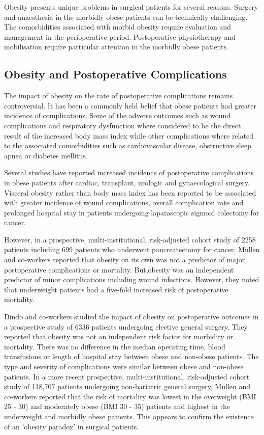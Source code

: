 Obesity presents unique problems in surgical patients for several reasons. Surgery and anaesthesia in the morbidly obese patients can be technically challenging. The comorbidities associated with morbid obesity require evaluation and management in the perioperative period. Postoperative physiotherapy and mobilisation require particular attention in the morbidly obese patients. 

\subsection{Obesity and Postoperative Complications}

The impact of obesity on the rate of postoperative complications remains controversial. It has been a commonly held belief that obese patients had greater incidence of complications. Some of the adverse outcomes such as wound complications and respiratory dysfunction where considered to be the direct result of the increased body mass index while other complications where related to the associated comorbidities such as cardiovascular disease, obstructive sleep apnea or diabetes mellitus. 

Several studies have reported increased incidence of postoperative complications in obese patients after cardiac, transplant, urologic and gynaecological surgery. \parencite{prem_operative_1965, holley_obesity_1990, fasol_influence_1992, gruberg_impact_2002, lee_impact_2004} Visceral obesity rather than body mass index has been reported to be associated with greater incidence of wound complications, overall complication rate and prolonged hospital stay in patients undergoing laparascopic sigmoid colectomy for cancer. \parencite{tsujinaka_visceral_2008}

However, in a prospective, multi-institutional, risk-adjusted cohort study of 2258 patients including 699 patients who underwent pancreatectomy for cancer, Mullen and co-workers reported that obesity on its own was not a predictor of major postoperative complications or mortality. But,obesity was an independent predictor of minor complications including wound infections. However, they noted that underweight patients had a five-fold increased risk of postoperative mortality. \parencite{mullen_impact_2008}

Dindo and co-workers studied the impact of obesity on postoperative outcomes in a prospective study of 6336 patients undergoing elective general surgery. They reported that obesity was not an independent risk factor for morbidity or mortality. There was no difference in the median operating time, blood transfusions or length of hospital stay between obese and non-obese patients. The type and severity of complications were similar between obese and non-obese patients. \parencite{dindo_obesity_2003} In a more recent prospective, multi-institutional, risk-adjusted cohort study of 118,707 patients undergoing non-bariatric general surgery, Mullen and co-workers reported that the risk of mortality was lowest in the overweight (BMI 25 - 30) and moderately obese (BMI 30 - 35) patients and highest in the underweight and morbidly obese patients. This appears to confirm the existence of an 'obesity paradox' in surgical patients. \parencite{mullen_obesity_2009}

